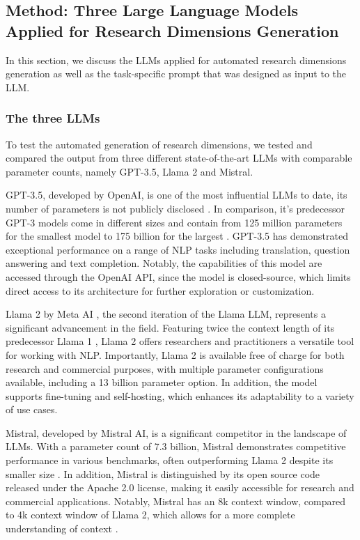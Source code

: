 \subsection{Method: Three Large Language Models Applied for Research Dimensions Generation}

In this section, we discuss the LLMs applied for automated research dimensions generation as well as the task-specific prompt that was designed as input to the LLM.

\subsubsection{The three LLMs}

To test the automated generation of research dimensions, we tested and compared the output from three different state-of-the-art LLMs with comparable parameter counts, namely GPT-3.5, Llama 2 and Mistral.

GPT-3.5, developed by OpenAI, is one of the most influential LLMs to date, its number of parameters is not publicly disclosed \cite{ChatGPT}. In comparison, it's predecessor GPT-3 models come in different sizes and contain from 125 million parameters for the smallest model to 175 billion for the largest \cite{brown2020language}. GPT-3.5 has demonstrated exceptional performance on a range of NLP tasks including translation, question answering and text completion. Notably, the capabilities of this model are accessed through the OpenAI API, since the model is closed-source, which limits direct access to its architecture for further exploration or customization.

Llama 2 by Meta AI \cite{touvron2023llama}, the second iteration of the Llama LLM, represents a significant advancement in the field. Featuring twice the context length of its predecessor Llama 1 \cite{touvron2023llama1}, Llama 2 offers researchers and practitioners a versatile tool for working with NLP. Importantly, Llama 2 is available free of charge for both research and commercial purposes, with multiple parameter configurations available, including a 13 billion parameter option. In addition, the model supports fine-tuning and self-hosting, which enhances its adaptability to a variety of use cases.

Mistral, developed by Mistral AI, is a significant competitor in the landscape of LLMs. With a parameter count of 7.3 billion, Mistral demonstrates competitive performance in various benchmarks, often outperforming Llama 2 despite its smaller size \cite{jiang2023mistral}. In addition, Mistral is distinguished by its open source code released under the Apache 2.0 license, making it easily accessible for research and commercial applications. Notably, Mistral has an 8k context window, compared to 4k context window of Llama 2, which allows for a more complete understanding of context \cite{thakkar2023comprehensive}.

